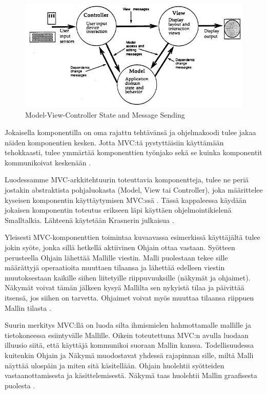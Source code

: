 \documentclass[utf8]{gradu3}
\begin{document}
\begin{figure}[h]
\centering
\includegraphics[scale=0.85]{krasner_mvc.jpg}
\caption{Model-View-Controller State and Message Sending \parencite[s. 5]{krasner_desc}}
\end{figure} 
Jokaisella komponentilla on oma rajattu tehtävänsä ja ohjelmakoodi tulee jakaa näiden komponentien kesken. Jotta MVC:tä pystyttäisiin käyttämään
tehokkaasti, tulee ymmärtää komponenttien työnjako sekä se kuinka komponentit kommunikoivat keskenään \parencite{burbeck}. 

Luodessamme MVC-arkkitehtuurin toteuttavia komponentteja, tulee ne periä jostakin abstraktista pohjaluokasta (Model, View tai Controller), joka määrittelee kyseisen komponentin käyttäytymisen MVC:ssä  \parencite[s. 5]{krasner_desc}.  Tässä kappaleessa käydään jokaisen komponentin toteutus erikseen läpi käyttäen ohjelmointikielenä Smalltalkia. Lähteenä käytetään Krasnerin julkaisua \parencite{krasner_desc}.

Yleisesti MVC-komponenttien toimintaa kuvaavassa esimerkissä käyttäjältä tulee jokin syöte, jonka sillä hetkellä aktiivinen Ohjain ottaa vastaan. Syötteen perusteella Ohjain lähettää Mallille viestin. Malli puolestaan tekee sille määrättyjä operaatioita muuttaen tilaansa ja lähettää edelleen viestin muutoksestaan kaikille siihen liitetyille riippuvuuksille (näkymät ja ohjaimet). Näkymät
voivat tämän jälkeen kysyä Mallilta sen nykyistä tilaa ja päivittää itsensä, jos siihen on tarvetta. Ohjaimet voivat myös muuttaa tilaansa riippuen Mallin tilasta \parencite[s. 4]{krasner_desc}. 

Suurin merkitys MVC:llä on luoda silta ihmismielen hahmottamalle mallille ja tietokoneessa esiintyvälle Mallille. Oikein toteutettuna MVC:n avulla luodaan illuusio siitä, että käyttäjä kommunikoi suoraan Mallin kanssa. Todellisuudessa kuitenkin Ohjain ja Näkymä muodostavat yhdessä rajapinnan sille, miltä Malli näyttää ulospäin ja miten sitä käsitellään. Ohjain huolehtii syötteiden vastaanottamisesta ja käsittelemisestä. Näkymä taas huolehtii Mallin graafisesta puolesta \parencite[s. 11-12]{reenskaug_tools}. 
\end{document}
